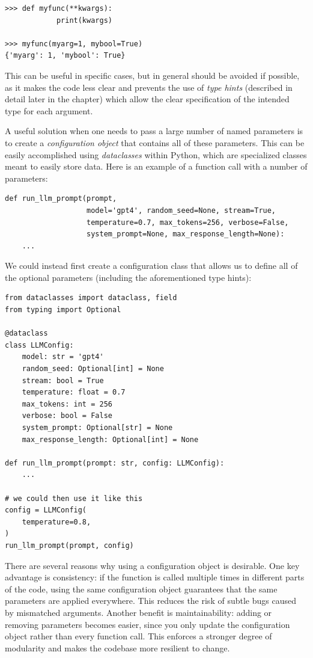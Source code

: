 \begin{lstlisting}[style=repl]
>>> def myfunc(**kwargs):
            print(kwargs)

>>> myfunc(myarg=1, mybool=True)
{'myarg': 1, 'mybool': True}
\end{lstlisting}

This can be useful in specific cases, but in general should be avoided if possible, as it makes the code less clear and prevents the use of \textit{type hints} (described in detail later in the chapter) which allow the clear specification of the intended type for each argument.

A useful solution when one needs to pass a large number of named parameters is to create a \textit{configuration object} that contains all of these parameters.
This can be easily accomplished using \textit{dataclasses} within Python, which are specialized classes meant to easily store data.
Here is an example of a function call with a number of parameters:

\begin{lstlisting}[style=Python]
def run_llm_prompt(prompt, 
                   model='gpt4', random_seed=None, stream=True,
                   temperature=0.7, max_tokens=256, verbose=False,
                   system_prompt=None, max_response_length=None):
    ...
\end{lstlisting}

We could instead first create a configuration class that allows us to define all of the optional parameters (including the aforementioned type hints):

\begin{lstlisting}[style=Python]
from dataclasses import dataclass, field
from typing import Optional

@dataclass
class LLMConfig:
    model: str = 'gpt4'
    random_seed: Optional[int] = None
    stream: bool = True
    temperature: float = 0.7
    max_tokens: int = 256
    verbose: bool = False
    system_prompt: Optional[str] = None
    max_response_length: Optional[int] = None

def run_llm_prompt(prompt: str, config: LLMConfig):
    ...

# we could then use it like this
config = LLMConfig(
    temperature=0.8,
)
run_llm_prompt(prompt, config)
\end{lstlisting}

There are several reasons why using a configuration object is desirable.
One key advantage is consistency: if the function is called multiple times in different parts of the code, using the same configuration object guarantees that the same parameters are applied everywhere. This reduces the risk of subtle bugs caused by mismatched arguments.
Another benefit is maintainability: adding or removing parameters becomes easier, since you only update the configuration object rather than every function call. This enforces a stronger degree of modularity and makes the codebase more resilient to change.

